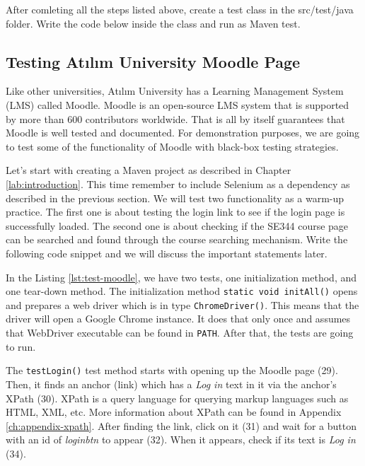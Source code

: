 After comleting all the steps listed above, create a test class in the src/test/java folder.  Write the code below inside the class and run as Maven test.


\subsection{Testing Atılım University Moodle Page}
Like other universities, Atılım University has a Learning Management System (LMS) called Moodle. Moodle is an open-source LMS system that is supported by more than 600 contributors worldwide. That is all by itself guarantees that Moodle is well tested and documented. For demonstration purposes, we are going to test some of the functionality of Moodle with black-box testing strategies.

Let's start with creating a Maven project as described in Chapter \ref{lab:introduction}. This time remember to include Selenium as a dependency as described in the previous section. We will test two functionality as a warm-up practice. The first one is about testing the login link to see if the login page is successfully loaded. The second one is about checking if the SE344 course page can be searched and found through the course searching mechanism. Write the following code snippet and we will discuss the important statements later.



In the Listing \ref{lst:test-moodle}, we have two tests, one initialization method, and one tear-down method. The initialization method \lstinline!static void initAll()! opens and prepares a web driver which is in type \lstinline!ChromeDriver()!. This means that the driver will open a Google Chrome instance. It does that only once and assumes that WebDriver executable can be found in \lstinline[language={}]!PATH!. After that, the tests are going to run.

The \lstinline!testLogin()! test method starts with opening up the Moodle page (29). Then, it finds an anchor (link) which has a \emph{Log in} text in it via the anchor's XPath (30). XPath is a query language for querying markup languages such as HTML, XML, etc. More information about XPath can be found in Appendix \ref{ch:appendix-xpath}. After finding the link, click on it (31) and wait for a button with an id of \emph{loginbtn} to appear (32). When it appears, check if its text is \emph{Log in} (34).

